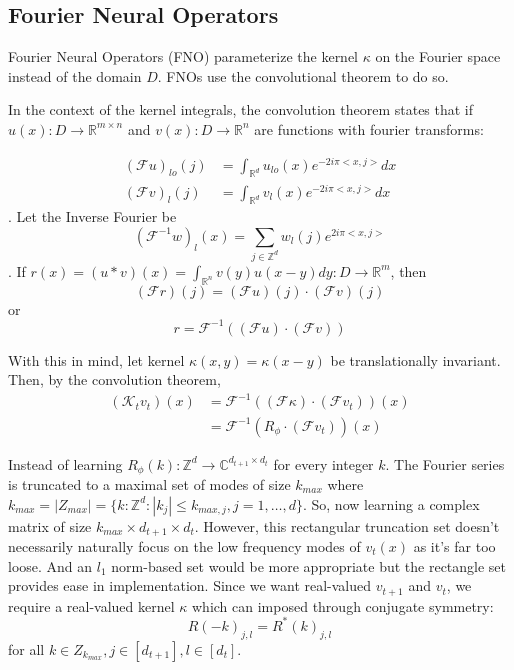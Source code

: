 \documentclass[12pt]{article}
\begin{document}
\subsection{Fourier Neural Operators}

Fourier Neural Operators (FNO) parameterize the kernel $\kappa$ on the Fourier space instead of the domain $D$. FNOs use the convolutional theorem to do so. 

In the context of the kernel integrals, the convolution theorem states that if $u(x): D \to \mathbb{R}^{m \times n}$ and $v(x): D\to \mathbb{R}^n$ are functions with fourier transforms:

\begin{align*}
    (\mathcal{F} u)_{lo} (j) &= \int_{\mathbb{R}^d}u_{lo}(x) e^{-2i\pi <x, j>} dx \\
     (\mathcal{F} v)_l (j) &=  \int_{\mathbb{R}^d} v_l(x) e^{-2i\pi <x, j>} dx
\end{align*}
. Let the Inverse Fourier be $$(\mathcal{F}^{-1} w)_l (x) = \sum_{j \in \mathbb{Z}^d} w_l(j)e^{2i\pi <x, j>} $$. If $r(x) = (u* v)(x) = \int_{\mathbb{R}^n} v(y)u(x - y)dy: D \to \mathbb{R}^m$, then
$$(\mathcal{F} r)(j) = (\mathcal{F} u) (j) \cdot (\mathcal{F} v) (j)$$ or $$r = \mathcal{F}^{-1} ((\mathcal{F} u)  \cdot (\mathcal{F} v))$$

With this in mind, let kernel $\kappa(x, y) = \kappa(x - y)$ be translationally invariant. Then, by the convolution theorem,
\begin{align*}
    (\mathcal{K}_tv_t)(x) &= \mathcal{F}^{-1} ((\mathcal{F} \kappa)  \cdot (\mathcal{F} v_t))(x) \\
     &= \mathcal{F}^{-1} (R_{\phi}  \cdot (\mathcal{F} v_t))(x)
\end{align*}

Instead of learning $R_{\phi}(k): \mathbb{Z}^d \to \mathbb{C}^{d_{t + 1} \times d_t}$ for every integer $k$. The Fourier series is truncated to a maximal set of modes of size $k_{max}$ where $k_{max} = |Z_{max}| = \{k: \mathbb{Z}^d: |k_j| \leq k_{max, j}, j = 1, \dots, d\}$. So, now learning a complex matrix of size $k_{max} \times d_{t + 1} \times d_t$. However, this rectangular truncation set doesn't necessarily naturally focus on the low frequency modes of $v_t(x)$ as it's far too loose. And an $l_1$ norm-based set would be more appropriate but the rectangle set provides ease in implementation. Since we want real-valued $v_{t + 1}$ and $v_t$, we require a real-valued kernel $\kappa$ which can imposed through conjugate symmetry:
$$R(-k)_{j, l} = R^*(k)_{j, l}$$
for all $k \in Z_{k_{max}}, j \in [d_{t + 1}], l \in [d_{t}]$.
\end{document}
